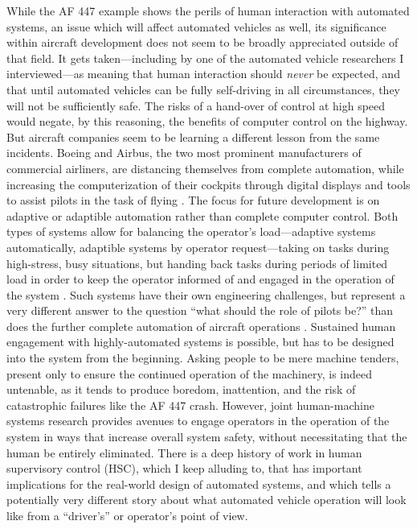 While the AF 447 example shows the
perils of human interaction with automated systems, an issue which will
affect automated vehicles as well, its significance
within aircraft development does not seem to be broadly appreciated
outside of that field. It gets taken---including by one of the
automated vehicle researchers I interviewed---as meaning that human
interaction should \emph{never} be expected, and that until automated
vehicles can be fully self-driving in all circumstances, they will not
be sufficiently safe. The risks of a hand-over of control at high
speed would negate, by this reasoning, the benefits of computer
control on the highway. But aircraft companies seem to be learning a
different lesson from the same incidents. Boeing and Airbus, the two
most prominent manufacturers of commercial airliners, are distancing
themselves from complete automation, while increasing the computerization of
their cockpits through digital displays and tools to assist pilots in
the task of flying \cite{787dream} \cite{brownFuture}. The focus for
future development is on adaptive or adaptible automation
rather than complete computer control. Both types of systems allow for
balancing the operator's load---adaptive systems automatically,
adaptible systems by operator request---taking on tasks during
high-stress, busy situations, but handing back tasks during periods of
limited load in order to keep the operator informed of and engaged in
the operation of the system \cite{dahai}. Such systems have their own
engineering challenges, but represent a very different answer to the
question ``what should the role of pilots be?'' than does the further
complete automation of aircraft operations \cite{kaber}. Sustained human engagement
with highly-automated systems is possible, but has to be designed into
the system from the beginning. Asking people to be mere machine
tenders, present only to ensure the continued operation of the
machinery, is indeed untenable, as it tends to produce boredom,
inattention, and the risk of catastrophic failures like the AF 447
crash. However, joint human-machine systems research provides avenues
to engage operators in the operation of the system in ways that
increase overall system safety, without necessitating that the human
be entirely eliminated. There is a deep history of
work in human supervisory control (HSC), which I keep alluding to,
that has important implications 
for the real-world design of automated systems, and which tells a
potentially very different story about what automated vehicle
operation will look like from a ``driver's'' or operator's point of view.

